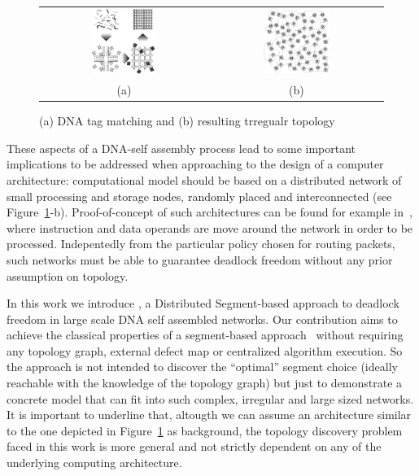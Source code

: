 \begin{figure}
\centering
\begin{tabular}{cc}
    \includegraphics[width=0.40\textwidth]{pictures/dna2b.eps} &
    \includegraphics[width=0.40\textwidth]{pictures/dna1_complex2.eps} \\
 (a) & (b)
 \end{tabular}
  \caption{(a) DNA tag matching and (b) resulting trregualr topology}
  \label{fig:nana}
\end{figure}
These aspects of a DNA-self assembly process lead to some important
implications to be addressed when approaching to the design of
a computer architecture: computational model should be based on a
distributed network of small processing and storage nodes, randomly
placed and interconnected (see Figure~\ref{fig:nana}-b).
Proof-of-concept of such architectures can be found for
example in~\cite{patwardhan2006_1}, where instruction and data
operands are move around the network in order to be processed.
Indepentedly from the particular policy chosen for routing packets,
such networks must be able to guarantee deadlock freedom without any
prior assumption on topology.

In this work we introduce \disr{}, a Distributed Segment-based approach
to deadlock freedom in large scale DNA self assembled networks. Our
contribution aims to achieve the classical properties of a
segment-based approach~\cite{mejia_ipdps06} without requiring any
topology graph, external defect map or centralized algorithm
execution.  So the \disr{} approach is not intended to discover the
``optimal'' segment choice (ideally reachable with the knowledge of
the topology graph) but just to demonstrate a concrete model that can
fit into such complex, irregular and large sized networks.
It is important to
underline that, altougth we can assume an architecture similar to the
one depicted in Figure~\ref{fig:nana} as background, the topology discovery
problem faced in this work is more general and not strictly dependent on any of the
underlying computing architecture.

